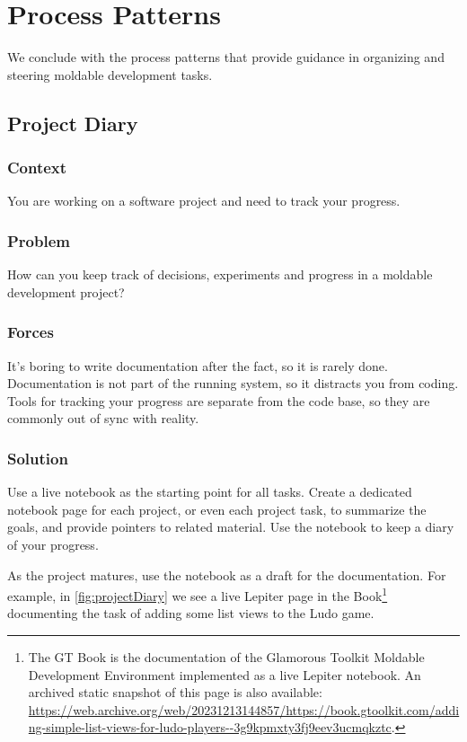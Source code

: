 \documentclass[sigconf]{acmart}
\newcommand{\GT}{\lst{GT}\xspace} %
\begin{document}
\section{Process Patterns}\label{sec:process}

We conclude with the process patterns that provide guidance in organizing and steering moldable development tasks.

\subsection*{Project Diary}\label{pat:projectDiary}

\subsubsection*{Context}
You are working on a software project and need to track your progress.

\subsubsection*{Problem}
How can you keep track of decisions, experiments and progress in a moldable development project?

\subsubsection*{Forces}
It's boring to write documentation after the fact, so it is rarely done.
Documentation is not part of the running system, so it distracts you from coding.
Tools for tracking your progress are separate from the code base, so they are commonly out of sync with reality.

\subsubsection*{Solution}
Use a live notebook as the starting point for all tasks.
Create a dedicated notebook page for each project, or even each project task, to summarize the goals, and provide pointers to related material.
Use the notebook to keep a diary of your progress.

As the project matures, use the notebook as a draft for the documentation.
For example, in \autoref{fig:projectDiary} we see a live Lepiter page in the \GT Book\footnote{The GT Book is the documentation of the Glamorous Toolkit Moldable Development Environment implemented as a live Lepiter notebook. An archived static snapshot of this page is also available: \url{https://web.archive.org/web/20231213144857/https://book.gtoolkit.com/adding-simple-list-views-for-ludo-players--3g9kpmxty3fj9eev3ucmqkztc}.} documenting the task of adding some list views to the Ludo game.
\end{document}
